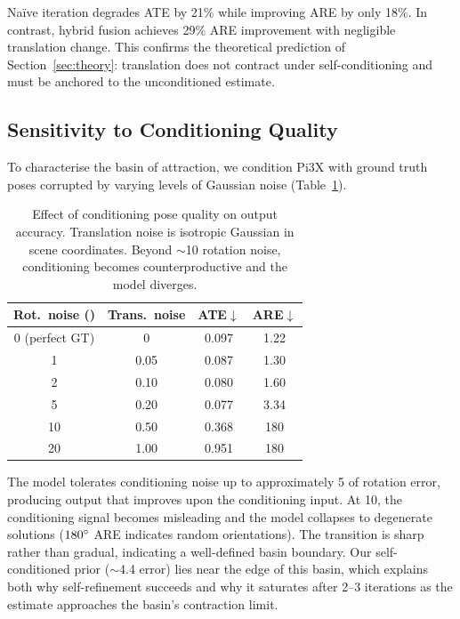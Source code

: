 Na\"ive iteration degrades ATE by 21\% while improving ARE by only 18\%. In contrast, hybrid fusion achieves 29\% ARE improvement with negligible translation change. This confirms the theoretical prediction of Section~\ref{sec:theory}: translation does not contract under self-conditioning and must be anchored to the unconditioned estimate.

\subsection{Sensitivity to Conditioning Quality}
\label{sec:noise_sensitivity}

To characterise the basin of attraction, we condition Pi3X with ground truth poses corrupted by varying levels of Gaussian noise (Table~\ref{tab:noise_robustness}).

\begin{table}[h]
\centering
\caption{Effect of conditioning pose quality on output accuracy. Translation noise is isotropic Gaussian in scene coordinates. Beyond $\sim$10\degree{} rotation noise, conditioning becomes counterproductive and the model diverges.}
\label{tab:noise_robustness}
\begin{tabular}{@{}cccc@{}}
\toprule
Rot.\ noise (\degree{}) & Trans.\ noise & ATE$\downarrow$ & ARE$\downarrow$ \\
\midrule
0 (perfect GT) & 0 & 0.097 & 1.22\degree{} \\
1 & 0.05 & 0.087 & 1.30\degree{} \\
2 & 0.10 & 0.080 & 1.60\degree{} \\
5 & 0.20 & 0.077 & 3.34\degree{} \\
10 & 0.50 & 0.368 & 180\degree{} \\
20 & 1.00 & 0.951 & 180\degree{} \\
\bottomrule
\end{tabular}
\end{table}

The model tolerates conditioning noise up to approximately 5\degree{} of rotation error, producing output that improves upon the conditioning input. At 10\degree{}, the conditioning signal becomes misleading and the model collapses to degenerate solutions ($180\degree{}$ ARE indicates random orientations). The transition is sharp rather than gradual, indicating a well-defined basin boundary. Our self-conditioned prior ($\sim$4.4\degree{} error) lies near the edge of this basin, which explains both why self-refinement succeeds and why it saturates after 2--3 iterations as the estimate approaches the basin's contraction limit.


